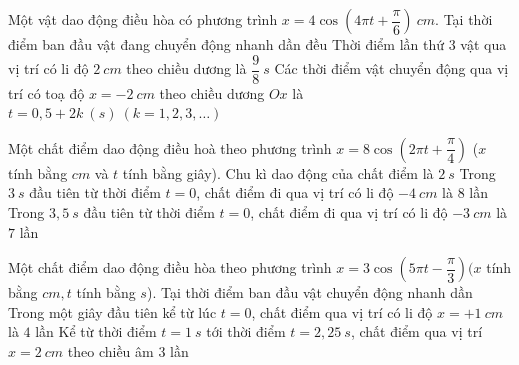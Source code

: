 \begin{ex}
Một vật dao động điều hòa có phương trình $x=4 \cos (4 \pi t+\dfrac{\pi}{6})\ cm$.
{Tại thời điểm ban đầu vật đang chuyển động nhanh dần đều}
{Thời điểm lần thứ 3 vật qua vị trí có li độ $2 \ cm$ theo chiều dương là $\dfrac{9}{8} \ s$}
{Các thời điểm vật chuyển động qua vị trí có toạ độ $x=-2 \ cm$ theo chiều dương $O x$ là $t=0,5+2 k\ (s)\ (k=1,2,3, \ldots)$} \loigiai{
\begin{itemchoice}
\itemch
\itemch
\itemch
\itemch
\end{itemchoice}
}
\end{ex} 
\begin{ex}
Một chất điểm dao động điều hoà theo phương trình $x=8 \cos \left(2 \pi t+\dfrac{\pi}{4}\right)$ ($x$ tính bằng $cm$ và $t$ tính bằng giây).
{Chu kì dao động của chất điểm là $2 \ s$}
{Trong $3\ s$ đầu tiên từ thời điểm $t=0$, chất điểm đi qua vị trí có li độ $-4 \ cm$ là $8$ lần}
{\True Trong $3,5 \ s$ đầu tiên từ thời điểm $t=0$, chất điểm đi qua vị trí có li độ $-3 \ cm$ là  $7$ lần}
\loigiai{
\begin{itemchoice}
\itemch
\itemch
\itemch
\itemch
\end{itemchoice}
}
\end{ex} 
\begin{ex}
Một chất điểm dao động điều hòa theo phương trình $x=3 \cos \left(5 \pi t-\dfrac{\pi}{3}\right)(x$ tính bằng $cm, t$ tính bằng $s$).
{Tại thời điểm ban đầu vật chuyển động nhanh dần}
{Trong một giây đầu tiên kể từ lúc $t=0$, chất điểm qua vị trí có li độ $x=+1 \ cm$ là $4$ lần}
{\True Kể từ thời điểm $t=1 \ s$ tới thời điểm $t=2,25 \ s$, chất điểm qua vị trí $x=2 \ cm$ theo chiều âm 3 lần} \loigiai{
\begin{itemchoice}
\itemch
\itemch
\itemch
\itemch
\end{itemchoice}
}
\end{ex} 













